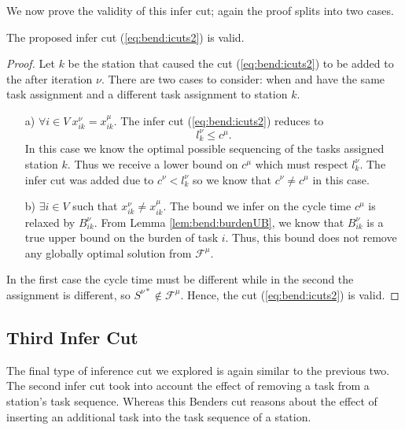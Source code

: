 We now prove the validity of this infer cut; again
the proof splits into two cases.

\begin{theorem}
	The proposed infer cut (\ref{eq:bend:icuts2}) is valid.
\end{theorem}
\begin{proof}
	Let $k$ be the station that caused the cut (\ref{eq:bend:icuts2})
	to be added to the \rmp{} after iteration $\nu$.
	There are two cases to consider: when \rmp{\mu} and \rmp{\nu} have the 
	same task assignment and a different task assignment to station $k$.
	\begin{itemize}
		\item[a)] $\forall i \in V ~ x_{ik}^{\nu} = x_{ik}^{\mu}$.
		The infer cut (\ref{eq:bend:icuts2}) reduces to
		\[ l_k^\nu \leq c^\mu. \]
		In this case we know the optimal possible sequencing
		of the tasks assigned station $k$.
		Thus we receive a lower bound on
		$c^\mu$ which must respect $l_k^\nu$.
		The infer cut was added due to $c^\nu<l_k^\nu$
		so we know that $c^\nu\neq c^\mu$ in this case.
		\item[b)] $\exists i \in V$ such that $x_{ik}^{\nu} \neq x_{ik}^{\mu}$.
		The bound we infer on the cycle time $c^\mu$ is relaxed by 
		$B_{ik}^\nu$.
		From Lemma \ref{lem:bend:burdenUB}, we know that $B_{ik}^\nu$
		is a true upper bound on the burden
		of task $i$.
		Thus, this bound does not remove any globally optimal solution
		from $\mathcal{F}^\mu$.
	\end{itemize}
	In the first case the cycle time must be different
	while in the second the assignment is different, so
	$S^{\nu*}\not\in \mathcal{F}^\mu$.
	Hence, the cut (\ref{eq:bend:icuts2}) is valid.
\end{proof}

\subsection{Third Infer Cut}
\label{sec:bend:Icuts3}
The final type of inference cut we explored is again
similar to the previous two.
The second infer cut took into account the
effect of removing a task from a station's
task sequence.
Whereas this Benders cut reasons about the effect of inserting
an additional task into the task sequence of a station.

